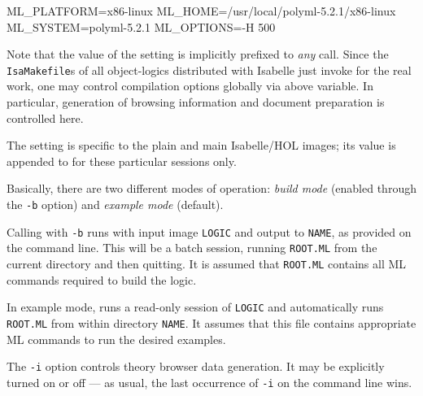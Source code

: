 \begin{isabellebody}
\begin{isamarkuptext}
\begin{ttbox}
  ML_PLATFORM=x86-linux
  ML_HOME=/usr/local/polyml-5.2.1/x86-linux
  ML_SYSTEM=polyml-5.2.1
  ML_OPTIONS=-H 500
\end{ttbox}

  Note that the value of the \hyperlink{setting.ISABELLE-USEDIR-OPTIONS}{\mbox{}}
  setting is implicitly prefixed to \emph{any} \hyperlink{tool.usedir}{\mbox{}}
  call. Since the \verb|IsaMakefile|s of all object-logics
  distributed with Isabelle just invoke \hyperlink{tool.usedir}{\mbox{}} for the real
  work, one may control compilation options globally via above
  variable. In particular, generation of  browsing
  information and document preparation is controlled here.

  The \hyperlink{setting.HOL-USEDIR-OPTIONS}{\mbox{}} setting is specific to the
  plain and main Isabelle/HOL images; its value is appended to
  \hyperlink{setting.ISABELLE-USEDIR-OPTIONS}{\mbox{}} for these particular sessions
  only.%
\end{isamarkuptext}%
\isamarkuptrue%
%
\isamarkuptrue%
%
\begin{isamarkuptext}%
Basically, there are two different modes of operation: \emph{build
  mode} (enabled through the \verb|-b| option) and
  \emph{example mode} (default).

  Calling \hyperlink{tool.usedir}{\mbox{}} with \verb|-b| runs \hyperlink{executable.isabelle-process}{\mbox{}} with input image \verb|LOGIC| and output to
  \verb|NAME|, as provided on the command line. This will be a
  batch session, running \verb|ROOT.ML| from the current
  directory and then quitting.  It is assumed that \verb|ROOT.ML|
  contains all ML commands required to build the logic.

  In example mode, \hyperlink{tool.usedir}{\mbox{}} runs a read-only session of
  \verb|LOGIC| and automatically runs \verb|ROOT.ML| from
  within directory \verb|NAME|.  It assumes that this file
  contains appropriate ML commands to run the desired examples.

  \medskip The \verb|-i| option controls theory browser data
  generation. It may be explicitly turned on or off --- as usual, the
  last occurrence of \verb|-i| on the command line wins.


\end{isamarkuptext}
\end{isabellebody}
